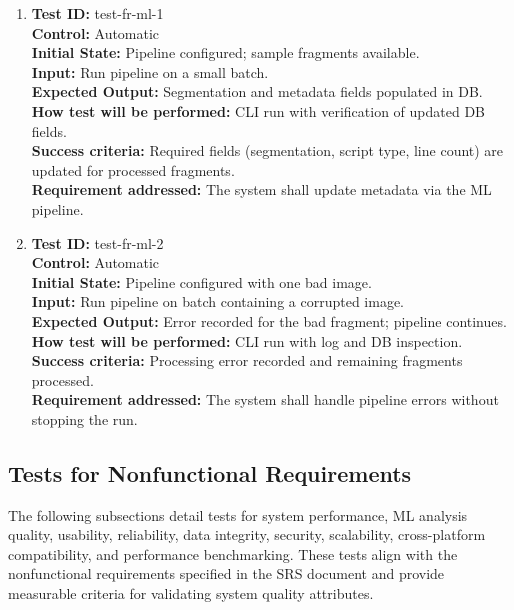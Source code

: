 \documentclass[12pt, titlepage]{article}
\begin{document}
\begin{enumerate}
    \item
    \textbf{Test ID:} test-fr-ml-1\\
    \textbf{Control:} Automatic\\
    \textbf{Initial State:} Pipeline configured; sample fragments available.\\
    \textbf{Input:} Run pipeline on a small batch.\\
    \textbf{Expected Output:} Segmentation and metadata fields populated in DB.\\
    \textbf{How test will be performed:} CLI run with verification of updated DB fields.\\
    \textbf{Success criteria:} Required fields (segmentation, script type, line count) are updated for processed fragments.\\
    \textbf{Requirement addressed:} The system shall update metadata via the ML pipeline.\\

    \item
    \textbf{Test ID:} test-fr-ml-2\\
    \textbf{Control:} Automatic\\
    \textbf{Initial State:} Pipeline configured with one bad image.\\
    \textbf{Input:} Run pipeline on batch containing a corrupted image.\\
    \textbf{Expected Output:} Error recorded for the bad fragment; pipeline continues.\\
    \textbf{How test will be performed:} CLI run with log and DB inspection.\\
    \textbf{Success criteria:} Processing error recorded and remaining fragments processed.\\
    \textbf{Requirement addressed:} The system shall handle pipeline errors without stopping the run.\\
\end{enumerate}

\subsection{Tests for Nonfunctional Requirements}

The following subsections detail tests for system performance, ML analysis quality, usability, reliability, data integrity, security, scalability, cross-platform compatibility, and performance benchmarking. These tests align with the nonfunctional requirements specified in the SRS document and provide measurable criteria for validating system quality attributes.
\end{document}
